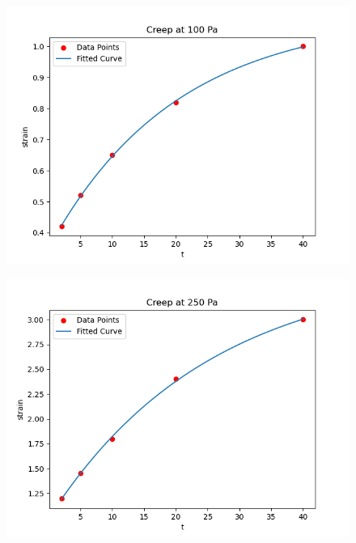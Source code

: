\documentclass{elsarticle}
\begin{document}
\begin{figure}[h]
\centering
\begin{minipage}{0.45\textwidth}
\centering
\includegraphics[width=\linewidth]{Hw_fig/1.png}
\label{fig:pic1}
\end{minipage}
\hfill
\begin{minipage}{0.45\textwidth}
\centering
\includegraphics[width=\linewidth]{Hw_fig/2.png}
\label{fig:pic2}
\end{minipage}
\end{figure}
\end{document}
